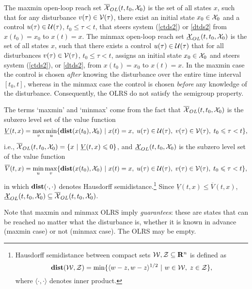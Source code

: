 The maxmin open-loop reach set $\OXOL(t, t_0, \XX_0)$ is the set of all states $x$,
such that for any disturbance $v(\tau)\in\VV(\tau)$, there exist an initial state
$x_0\in\XX_0$ and a control $u(\tau)\in\UU(\tau)$, $t_0\leq\tau<t$, that
steers system (\ref{ctds2}) or \ref{dtds2} from $x(t_0)=x_0$ to $x(t)=x$.
\label{def_maxminolrs}
\ed
{}
The minmax open-loop reach set $\UXOL(t, t_0, \XX_0)$ is the set of all states $x$,
such that there exists a control $u(\tau)\in\UU(\tau)$ that for all disturbances
$v(\tau)\in\VV(\tau)$, $t_0\leq\tau<t$, assigns an initial state $x_0\in\XX_0$
and steers system (\ref{ctds2}), or \ref{dtds2}, from $x(t_0)=x_0$ to $x(t)=x$.
\label{def_minmaxolrs}
\ed
In the maxmin case the control is chosen \emph{after} knowing the disturbance
over the entire time interval $[t_0, t]$, whereas in the minmax case
the control is chosen \emph{before} any knowledge
of the disturbance.   Consequently, the OLRS do not satisfy the semigroup property.

The terms `maxmin' and `minmax' come from the fact that
$\OXOL(t, t_0, \XX_0)$ is the subzero level set of the value function
\begin{equation}
\underline{V}(t, x) =
\max_v\min_u\{{\bf dist}(x(t_0), \XX_0) ~|~ x(t)=x, \; u(\tau)\in\UU(\tau), \;
v(\tau)\in\VV(\tau), \; t_0\leq\tau<t\},
\label{maxminvf}
\end{equation}
i.e., $\OXOL(t, t_0, \XX_0) = \{ x~|~\underline{V}(t, x) \le 0\}$,
and $\UXOL(t, t_0, \XX_0)$ is the subzero level set of the value function
\begin{equation}
\overline{V}(t, x) =
\min_u\max_v\{{\bf dist}(x(t_0), \XX_0) ~|~ x(t)=x, \; u(\tau)\in\UU(\tau), \;
v(\tau)\in\VV(\tau), \; t_0\leq\tau<t\},
\label{minmaxvf}
\end{equation}
in which ${\bf dist}(\cdot, \cdot)$ denotes Hausdorff
semidistance.\footnote{Hausdorff semidistance between compact sets
$\WW, \ZZ \subseteq {\bf R}^n$ is defined as
\[ {\bf dist}(\WW, \ZZ) = \min\{\langle w-z, w-z\rangle^{1/2}
~|~ w\in\WW, \; z\in\ZZ\}, \]
where $\langle\cdot, \cdot\rangle$ denotes inner product.}
Since $\underline{V}(t, x)\leq\overline{V}(t, x)$,
$\UXOL(t, t_0, \XX_0)\subseteq\OXOL(t, t_0, \XX_0)$.

Note that maxmin and minmax OLRS imply \emph{guarantees}: these are states that can be reached
no matter what the disturbance is, whether it is known in advance
(maxmin case) or not (minmax case).
The OLRS may be empty.


